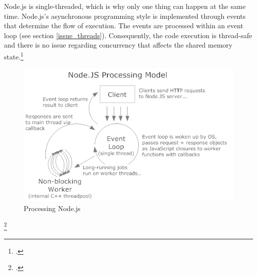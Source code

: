 Node.js is single-threaded, which is why only one thing can happen at the same
time. Node.js's asynchronous programming style is implemented through events
that determine the flow of execution. The events are processed within an event
loop (see section \ref{issue_threads}). Consequently, the code execution is
thread-safe and there is no issue regarding concurrency that affects the shared
memory state.\footcite[Cf.][p.16]{teixeira_2012}

\begin{figure}[hbtp]
\centering
\includegraphics[width=\textwidth]{img/processing_model.png}
\caption[Processing Node.js]{Processing Node.js\footnotemark}
\label{fig:processing_model}
\end{figure}
\footcitetext{aaronstannard_2011}

